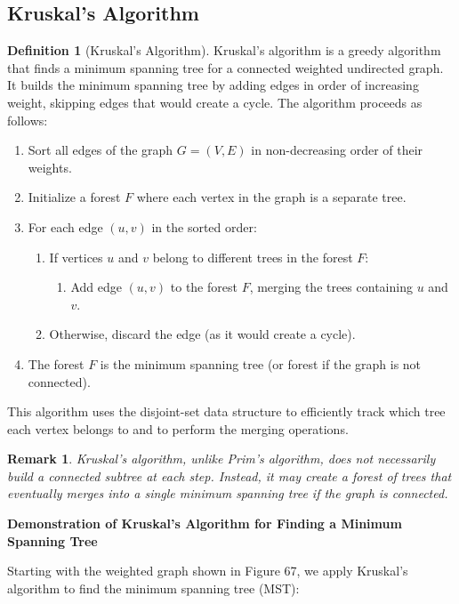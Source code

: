 \documentclass{article}
\newtheorem{remark}{Remark}
\theoremstyle{definition}
\newtheorem{definition}{Definition}
\begin{document}
\pagebreak

\subsection{Kruskal's Algorithm}

\begin{definition}[Kruskal's Algorithm]
Kruskal's algorithm is a greedy algorithm that finds a minimum spanning tree for a connected weighted undirected graph. It builds the minimum spanning tree by adding edges in order of increasing weight, skipping edges that would create a cycle. The algorithm proceeds as follows:
\begin{enumerate}
\item Sort all edges of the graph $G = (V, E)$ in non-decreasing order of their weights.
\item Initialize a forest $F$ where each vertex in the graph is a separate tree.
\item For each edge $(u,v)$ in the sorted order:
   \begin{enumerate}
   \item If vertices $u$ and $v$ belong to different trees in the forest $F$:
      \begin{enumerate}
      \item Add edge $(u,v)$ to the forest $F$, merging the trees containing $u$ and $v$.
      \end{enumerate}
   \item Otherwise, discard the edge (as it would create a cycle).
   \end{enumerate}
\item The forest $F$ is the minimum spanning tree (or forest if the graph is not connected).
\end{enumerate}
This algorithm uses the disjoint-set data structure to efficiently track which tree each vertex belongs to and to perform the merging operations.
\end{definition}

\begin{remark}
Kruskal's algorithm, unlike Prim's algorithm, does not necessarily build a connected subtree at each step. Instead, it may create a forest of trees that eventually merges into a single minimum spanning tree if the graph is connected.
\end{remark}


\noindent\textbf{Demonstration of Kruskal's Algorithm for Finding a Minimum Spanning Tree}

Starting with the weighted graph shown in Figure 67, we apply Kruskal's algorithm to find the minimum spanning tree (MST):
\end{document}
